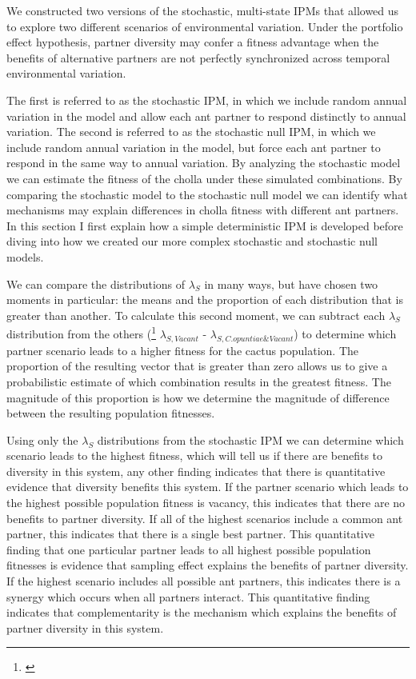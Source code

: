 \documentclass[11pt]{article}
\newcommand{\ali}[2]{{\color{blue}{#1}}\footnote{\textit{\color{blue}{#2}}}}
\begin{document}
We constructed two versions of the stochastic, multi-state IPMs that allowed us to explore two different scenarios of environmental variation. 
Under the portfolio effect hypothesis, partner diversity may confer a fitness advantage when the benefits of alternative partners are not perfectly synchronized across temporal environmental variation. 



The first is referred to as the stochastic IPM, in which we include random annual variation in the model and allow each ant partner to respond distinctly to annual variation. 
The second is referred to as the stochastic null IPM, in which we include random annual variation in the model, but force each ant partner to respond in the same way to annual variation. 
By analyzing the stochastic model we can estimate the fitness of the cholla under these simulated combinations.
By comparing the stochastic model to the stochastic null model we can identify what mechanisms may explain differences in cholla fitness with different ant partners. 
In this section I first explain how a simple deterministic IPM is developed before diving into how we created our more complex stochastic and stochastic null models. 




We can compare the distributions of $\lambda_{S}$ in many ways, but have chosen two moments in particular: the means and the proportion of each distribution that is greater than another.
To calculate this second moment, we can subtract each $\lambda_{S}$ distribution from the others (\ali{e.g.}{This notation may need to be revised somewhat} $\lambda_{S,Vacant}$ - $\lambda_{S,C. opuntiae \& Vacant}$) to determine which partner scenario leads to a higher fitness for the cactus population. 
The proportion of the resulting vector that is greater than zero allows us to give a probabilistic estimate of which combination results in the greatest fitness. 
The magnitude of this proportion is how we determine the magnitude of difference between the resulting population fitnesses. 

Using only the $\lambda_S$ distributions from the stochastic IPM we can determine which scenario leads to the highest fitness, which will tell us if there are benefits to diversity in this system, any other finding indicates that there is quantitative evidence that diversity benefits this system. 
If the partner scenario which leads to the highest possible population fitness is vacancy, this indicates that there are no benefits to partner diversity.
If all of the highest scenarios include a common ant partner, this indicates that there is a single best partner. 
This quantitative finding that one particular partner leads to all highest possible population fitnesses is evidence that sampling effect explains the benefits of partner diversity.
If the highest scenario includes all possible ant partners, this indicates there is a synergy which occurs when all partners interact.
This quantitative finding indicates that complementarity is the mechanism which explains the benefits of partner diversity in this system.
\end{document}
